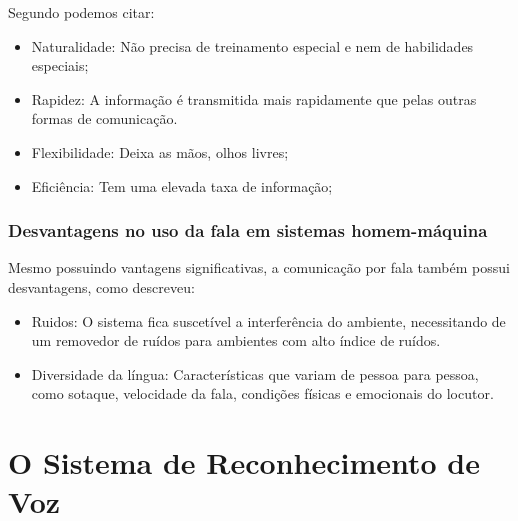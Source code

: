 Segundo  podemos citar:

\begin{itemize}
\item Naturalidade: Não precisa de treinamento especial e nem de habilidades especiais;
\item Rapidez: A informação é transmitida mais rapidamente que pelas outras formas de comunicação.
\item Flexibilidade: Deixa as mãos, olhos livres;
\item Eficiência: Tem uma elevada taxa de informação;
\end{itemize}

\subsubsection{Desvantagens no uso da fala em sistemas homem-máquina}
Mesmo possuindo vantagens significativas, a comunicação por fala também possui desvantagens, como  descreveu:

\begin{itemize}
\item Ruidos: O sistema fica suscetível a interferência do ambiente, necessitando de um removedor de ruídos para ambientes com alto índice de ruídos.
\item Diversidade da língua: Características que variam de pessoa para pessoa, como sotaque, velocidade da fala, condições físicas e emocionais do locutor. 
\end{itemize}

\section{O Sistema de Reconhecimento de Voz}\label{sec:red_khn}

